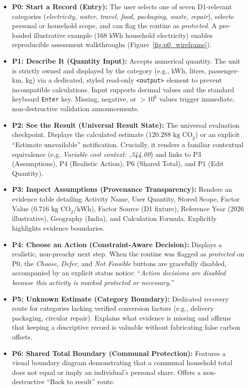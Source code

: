 \documentclass[12pt,a4paper]{article}
\newcommand{\code}[1]{\texttt{#1}}
\begin{document}
\begin{itemize}[leftmargin=*]
  \item \textbf{P0: Start a Record (Entry):} The user selects one of seven D1-relevant categories (\emph{electricity, water, travel, food, packaging, waste, repair}), selects personal or household scope, and can flag the routine as \emph{protected}. A pre-loaded illustrative example (168 kWh household electricity) enables reproducible assessment walkthroughs (Figure~\ref{fig:p0_wireframe}).
  
  \item \textbf{P1: Describe It (Quantity Input):} Accepts numerical quantity. The unit is strictly owned and displayed by the category (e.g., kWh, litres, passenger-km, kg) via a dedicated, styled read-only \code{<output>} element to prevent incompatible calculations. Input supports decimal values and the standard keyboard \code{Enter} key. Missing, negative, or $>10^6$ values trigger immediate, non-destructive validation announcements.
  
  \item \textbf{P2: See the Result (Universal Result State):} The universal evaluation checkpoint. Displays the calculated estimate ($120.288\text{ kg CO}_2$) or an explicit ``Estimate unavailable'' notification. Crucially, it renders a familiar contextual equivalence (e.g. \emph{Variable cost context: ,344.00}) and links to P3 (Assumptions), P4 (Realistic Action), P6 (Shared Total), and P1 (Edit Quantity).
  
  \item \textbf{P3: Inspect Assumptions (Provenance Transparency):} Renders an evidence table detailing Activity Name, User Quantity, Stored Scope, Factor Value ($0.716\text{ kg CO}_2\text{/kWh}$), Factor Source (D1 fixture), Reference Year (2026 illustrative), Geography (India), and Calculation Formula. Explicitly highlights evidence boundaries.
  
  \item \textbf{P4: Choose an Action (Constraint-Aware Decision):} Displays a realistic, non-preachy next step. When the routine was flagged as \emph{protected} on P0, the \emph{Choose}, \emph{Defer}, and \emph{Not Feasible} buttons are gracefully disabled, accompanied by an explicit status notice: ``\emph{Action decisions are disabled because this activity is marked protected or necessary.}''
  
  \item \textbf{P5: Unknown Estimate (Category Boundary):} Dedicated recovery route for categories lacking verified conversion factors (e.g., delivery packaging, circular repair). Explains what evidence is missing and affirms that keeping a descriptive record is valuable without fabricating false carbon offsets.
  
  \item \textbf{P6: Shared Total Boundary (Communal Protection):} Features a visual boundary diagram demonstrating that a communal household total does not equal or imply an individual's personal share. Offers a non-destructive ``Back to result'' route.
\end{itemize}
\end{document}
